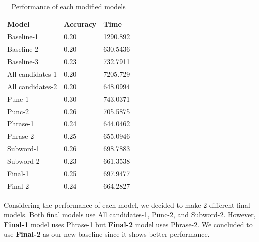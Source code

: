 \documentclass[11pt,a4paper]{article}
\begin{document}
\begin{table}[hbt!]
\begin{tabularx}{\columnwidth}{X|l|l}
\hline
\textbf{Model}   & \textbf{Accuracy} & \textbf{Time}     \\ \hline
Baseline-1       & 0.20     & 1290.892 \\ %
Baseline-2       & 0.20     & 630.5436  \\ %
Baseline-3       & 0.23     & 732.7911  \\ %
All candidates-1 & 0.20     & 7205.729 \\ %
All candidates-2 & 0.20     & 648.0994  \\ %
Punc-1           & 0.30     & 743.0371  \\ %
Punc-2           & 0.26     & 705.5875  \\ %
Phrase-1         & 0.24     & 644.0462  \\ %
Phrase-2         & 0.25     & 655.0946  \\ %
Subword-1        & 0.26     & 698.7883  \\ %
Subword-2        & 0.23     & 661.3538  \\ %
Final-1          & 0.25     & 697.9477  \\ %
Final-2          & 0.24     & 664.2827  \\ \hline
\end{tabularx}
\caption{Performance of each modified models}
\label{tab:result_modification}
\end{table}

Considering the performance of each model, we decided to make 2 different final models. 
Both final models use All candidates-1, Punc-2, and Subword-2.
However, \textbf{Final-1} model uses Phrase-1 but \textbf{Final-2} model uses Phrase-2.
We concluded to use \textbf{Final-2} as our new baseline since it shows better performance.
\end{document}
